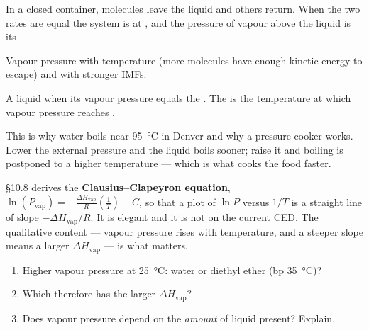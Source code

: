 \documentclass{apchem-notes}
\begin{document}


In a closed container, molecules leave the liquid and others return. When
the two rates are equal the system is at
, and the pressure of vapour above the
liquid is its .

Vapour pressure  with temperature (more
molecules have enough kinetic energy to escape) and
 with stronger IMFs.


A liquid  when its vapour pressure equals the
. The  is
the temperature at which vapour pressure reaches
.

\begin{apcnote}
This is why water boils near \SI{95}{\celsius} in Denver and why a pressure
cooker works. Lower the external pressure and the liquid boils sooner; raise
it and boiling is postponed to a higher temperature --- which is what cooks
the food faster.
\end{apcnote}

\begin{apcnote}
\S10.8 derives the \textbf{Clausius--Clapeyron equation},
$\ln(P_{\text{vap}}) = -\frac{\Delta H_{\text{vap}}}{R}\left(\frac1T\right)
+ C$, so that a plot of $\ln P$ versus $1/T$ is a straight line of slope
$-\Delta H_{\text{vap}}/R$. It is elegant and it is not on the current CED.
The qualitative content --- vapour pressure rises with temperature, and a
steeper slope means a larger $\Delta H_{\text{vap}}$ --- is what matters.
\end{apcnote}


\begin{enumerate}[leftmargin=*,itemsep=0.3em]
  \item Higher vapour pressure at \SI{25}{\celsius}: water or diethyl ether
        (bp \SI{35}{\celsius})? 
  \item Which therefore has the larger $\Delta H_{\text{vap}}$?
  \item Does vapour pressure depend on the \emph{amount} of liquid present?
        Explain. 
\end{enumerate}
\end{document}
